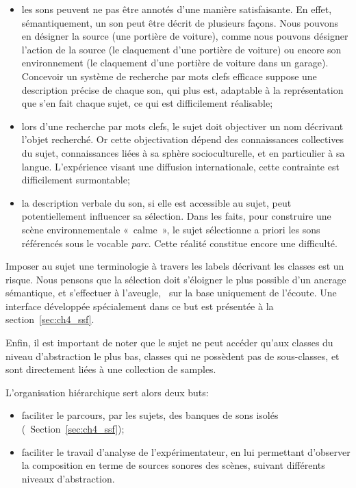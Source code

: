 \begin{itemize}
\item les sons peuvent ne pas être annotés d'une manière satisfaisante. En effet, sémantiquement, un son peut être décrit de plusieurs façons. Nous pouvons en désigner la source (une portière de voiture), comme nous pouvons désigner l'action de la source (le claquement d’une portière de voiture) ou encore son environnement (le claquement d’une portière de voiture dans un garage). Concevoir un système de recherche par mots clefs efficace suppose une description précise de chaque son, qui plus est, adaptable à la représentation que s’en fait chaque sujet, ce qui est difficilement réalisable;

\item lors d'une recherche par mots clefs, le sujet doit objectiver un nom décrivant l'objet recherché. Or cette objectivation dépend des connaissances collectives du sujet, connaissances liées à sa sphère socioculturelle, et en particulier à sa langue. L'expérience visant une diffusion internationale, cette contrainte est difficilement surmontable;

\item la description verbale du son, si elle est accessible au sujet, peut potentiellement influencer sa sélection. Dans les faits, pour construire une scène environnementale «~calme~», le sujet sélectionne a priori les sons référencés sous le vocable \emph{parc}. Cette réalité constitue encore une difficulté.
\end{itemize}

Imposer au sujet une terminologie à travers les labels décrivant les classes est un risque. Nous pensons que la sélection doit s'éloigner le plus possible d'un ancrage sémantique, et s'effectuer à l'aveugle, \ie~sur la base uniquement de l'écoute. Une interface développée spécialement dans ce but est présentée à la section~\ref{sec:ch4_ssf}.

Enfin, il est important de noter que le sujet ne peut accéder qu'aux classes du niveau d'abstraction le plus bas, classes qui ne possèdent pas de sous-classes, et sont directement liées à une collection de samples.

L’organisation hiérarchique sert alors deux buts:

\begin{itemize}
\item faciliter le parcours, par les sujets, des banques de sons isolés (\cf~Section~\ref{sec:ch4_ssf});
\item faciliter le travail d'analyse de l'expérimentateur, en lui permettant d'observer la composition en terme de sources sonores des scènes, suivant différents niveaux d'abstraction.
\end{itemize}

